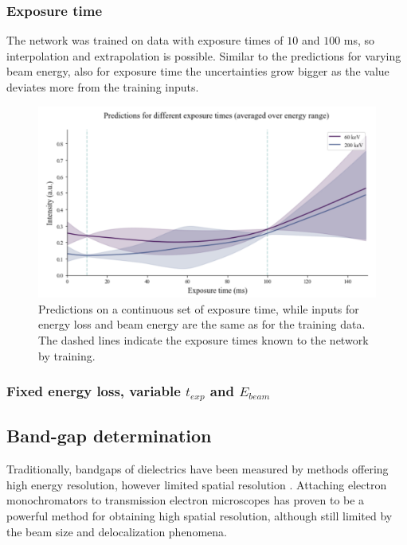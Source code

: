 \subsubsection{Exposure time}
The network was trained on data with exposure times of $10$ and $100$ ms, so interpolation and extrapolation is possible. Similar to the predictions for varying beam energy, also for exposure time the uncertainties grow bigger as the value deviates more from the training inputs.

\begin{figure}[H]
    \centering
    \includegraphics[width=120mm]{plots/Extrapolate_exposuretime.png}
    \caption{Predictions on a continuous set of exposure time, while inputs for energy loss and beam energy are the same as for the training data. The dashed lines indicate the exposure times known to the network by training.}
    \label{fig:extrapolbeam}
\end{figure}

\subsubsection{Fixed energy loss, variable $t_{exp}$ and $E_{beam}$ }




\subsubsection{}



\subsection{Band-gap determination}

Traditionally, bandgaps of dielectrics have been measured by methods offering high energy resolution, however limited spatial resolution \cite{Park:2008}. Attaching electron monochromators to transmission electron microscopes has proven to be a powerful method for obtaining high spatial resolution, although still limited by the beam size and delocalization phenomena. 

